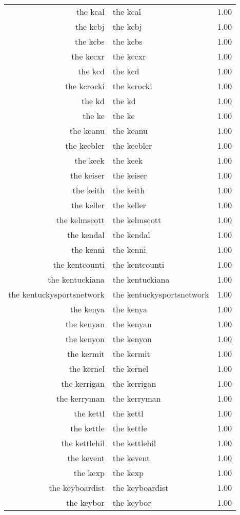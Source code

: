 \begin{table}[ht]
\begin{tabular}{rlr}
  the kcal & the kcal & 1.00 \\ 
  the kcbj & the kcbj & 1.00 \\ 
  the kcbs & the kcbs & 1.00 \\ 
  the kccxr & the kccxr & 1.00 \\ 
  the kcd & the kcd & 1.00 \\ 
  the kcrocki & the kcrocki & 1.00 \\ 
  the kd & the kd & 1.00 \\ 
  the ke & the ke & 1.00 \\ 
  the keanu & the keanu & 1.00 \\ 
  the keebler & the keebler & 1.00 \\ 
  the keek & the keek & 1.00 \\ 
  the keiser & the keiser & 1.00 \\ 
  the keith & the keith & 1.00 \\ 
  the keller & the keller & 1.00 \\ 
  the kelmscott & the kelmscott & 1.00 \\ 
  the kendal & the kendal & 1.00 \\ 
  the kenni & the kenni & 1.00 \\ 
  the kentcounti & the kentcounti & 1.00 \\ 
  the kentuckiana & the kentuckiana & 1.00 \\ 
  the kentuckysportsnetwork & the kentuckysportsnetwork & 1.00 \\ 
  the kenya & the kenya & 1.00 \\ 
  the kenyan & the kenyan & 1.00 \\ 
  the kenyon & the kenyon & 1.00 \\ 
  the kermit & the kermit & 1.00 \\ 
  the kernel & the kernel & 1.00 \\ 
  the kerrigan & the kerrigan & 1.00 \\ 
  the kerryman & the kerryman & 1.00 \\ 
  the kettl & the kettl & 1.00 \\ 
  the kettle & the kettle & 1.00 \\ 
  the kettlehil & the kettlehil & 1.00 \\ 
  the kevent & the kevent & 1.00 \\ 
  the kexp & the kexp & 1.00 \\ 
  the keyboardist & the keyboardist & 1.00 \\ 
  the keybor & the keybor & 1.00 \\ 

\end{tabular}
\end{table}
